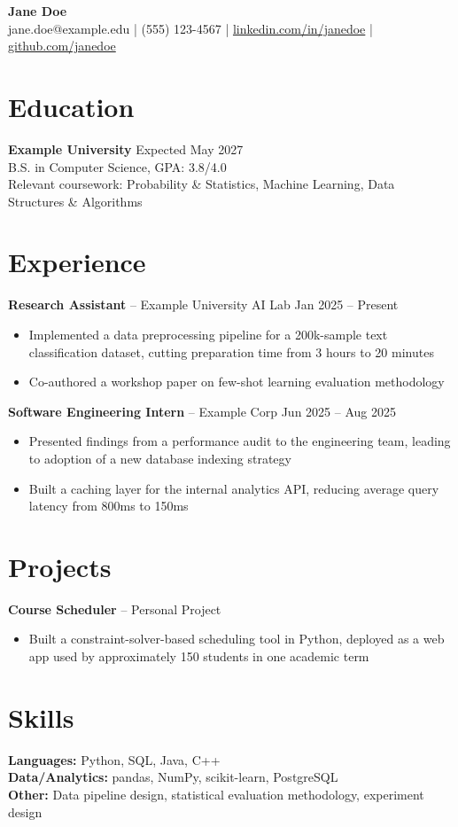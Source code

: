 \documentclass[10pt]{article}
\begin{document}
\begin{center}
    {\LARGE \textbf{Jane Doe}} \\
    \vspace{2pt}
    jane.doe@example.edu \quad | \quad (555) 123-4567 \quad | \quad
    \href{https://linkedin.com/in/janedoe}{linkedin.com/in/janedoe} \quad | \quad
    \href{https://github.com/janedoe}{github.com/janedoe}
\end{center}

\section*{Education}
\textbf{Example University} \hfill Expected May 2027 \\
B.S. in Computer Science, GPA: 3.8/4.0 \\
Relevant coursework: Probability \& Statistics, Machine Learning, Data Structures \& Algorithms

\section*{Experience}
\textbf{Research Assistant} -- Example University AI Lab \hfill Jan 2025 -- Present
\begin{itemize}
    \item Implemented a data preprocessing pipeline for a 200k-sample text classification dataset, cutting preparation time from 3 hours to 20 minutes
    \item Co-authored a workshop paper on few-shot learning evaluation methodology
\end{itemize}

\textbf{Software Engineering Intern} -- Example Corp \hfill Jun 2025 -- Aug 2025
\begin{itemize}
    \item Presented findings from a performance audit to the engineering team, leading to adoption of a new database indexing strategy
    \item Built a caching layer for the internal analytics API, reducing average query latency from 800ms to 150ms
\end{itemize}

\section*{Projects}
\textbf{Course Scheduler} -- Personal Project
\begin{itemize}
    \item Built a constraint-solver-based scheduling tool in Python, deployed as a web app used by approximately 150 students in one academic term
\end{itemize}

\section*{Skills}
\textbf{Languages:} Python, SQL, Java, C++ \\
\textbf{Data/Analytics:} pandas, NumPy, scikit-learn, PostgreSQL \\
\textbf{Other:} Data pipeline design, statistical evaluation methodology, experiment design
\end{document}

